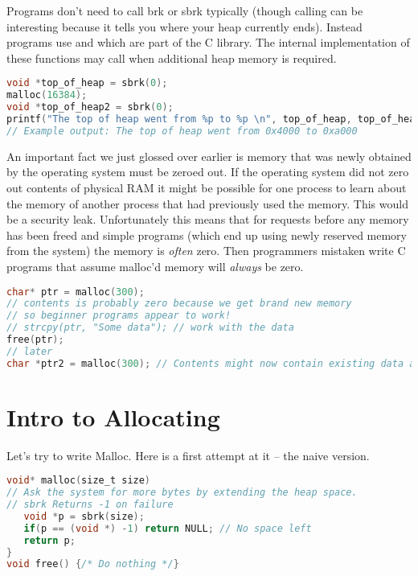 Programs don't need to call brk or sbrk typically (though calling  can be interesting because it tells you where your heap currently ends).
Instead programs use  and  which are part of the C library.
The internal implementation of these functions may call  when additional heap memory is required.

\begin{lstlisting}[language=C]
void *top_of_heap = sbrk(0);
malloc(16384);
void *top_of_heap2 = sbrk(0);
printf("The top of heap went from %p to %p \n", top_of_heap, top_of_heap2);
// Example output: The top of heap went from 0x4000 to 0xa000
\end{lstlisting}

An important fact we just glossed over earlier is memory that was newly obtained by the operating system must be zeroed out.
If the operating system did not zero out contents of physical RAM it might be possible for one process to learn about the memory of another process that had previously used the memory.
This would be a security leak.
Unfortunately this means that for  requests before any memory has been freed and simple programs (which end up using newly reserved memory from the system) the memory is \emph{often} zero.
Then programmers mistaken write C programs that assume malloc'd memory will \emph{always} be zero.

\begin{lstlisting}[language=C]
char* ptr = malloc(300);
// contents is probably zero because we get brand new memory
// so beginner programs appear to work!
// strcpy(ptr, "Some data"); // work with the data
free(ptr);
// later
char *ptr2 = malloc(300); // Contents might now contain existing data and is probably not zero
\end{lstlisting}

\section{Intro to Allocating}

Let's try to write Malloc.
Here is a first attempt at it -- the naive version.

\begin{lstlisting}[language=C]
void* malloc(size_t size)
// Ask the system for more bytes by extending the heap space. 
// sbrk Returns -1 on failure
   void *p = sbrk(size); 
   if(p == (void *) -1) return NULL; // No space left
   return p;
}
void free() {/* Do nothing */}
\end{lstlisting}

